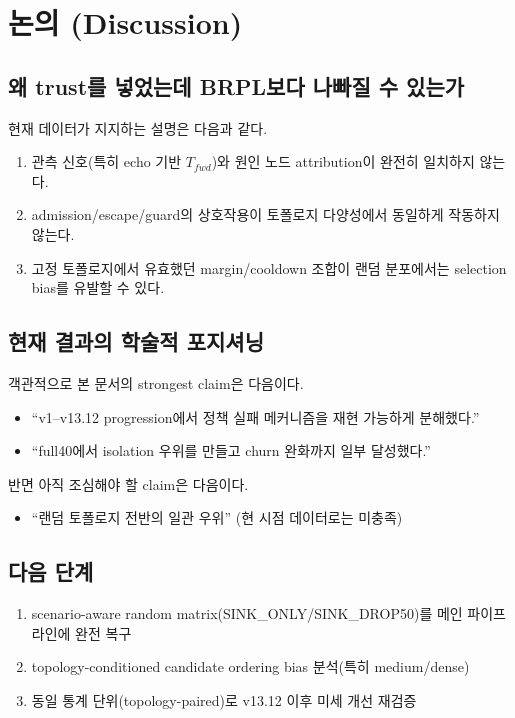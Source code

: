 \documentclass[11pt,a4paper]{report}
\begin{document}
\chapter{논의 (Discussion)}
\section{왜 trust를 넣었는데 BRPL보다 나빠질 수 있는가}
현재 데이터가 지지하는 설명은 다음과 같다.
\begin{enumerate}
  \item 관측 신호(특히 echo 기반 $T_{fwd}$)와 원인 노드 attribution이 완전히 일치하지 않는다.
  \item admission/escape/guard의 상호작용이 토폴로지 다양성에서 동일하게 작동하지 않는다.
  \item 고정 토폴로지에서 유효했던 margin/cooldown 조합이 랜덤 분포에서는 selection bias를 유발할 수 있다.
\end{enumerate}

\section{현재 결과의 학술적 포지셔닝}
객관적으로 본 문서의 strongest claim은 다음이다.
\begin{itemize}
  \item ``v1--v13.12 progression에서 정책 실패 메커니즘을 재현 가능하게 분해했다.''
  \item ``full40에서 isolation 우위를 만들고 churn 완화까지 일부 달성했다.''
\end{itemize}

반면 아직 조심해야 할 claim은 다음이다.
\begin{itemize}
  \item ``랜덤 토폴로지 전반의 일관 우위'' (현 시점 데이터로는 미충족)
\end{itemize}

\section{다음 단계}
\begin{enumerate}
  \item scenario-aware random matrix(SINK\_ONLY/SINK\_DROP50)를 메인 파이프라인에 완전 복구
  \item topology-conditioned candidate ordering bias 분석(특히 medium/dense)
  \item 동일 통계 단위(topology-paired)로 v13.12 이후 미세 개선 재검증
\end{enumerate}
\end{document}
